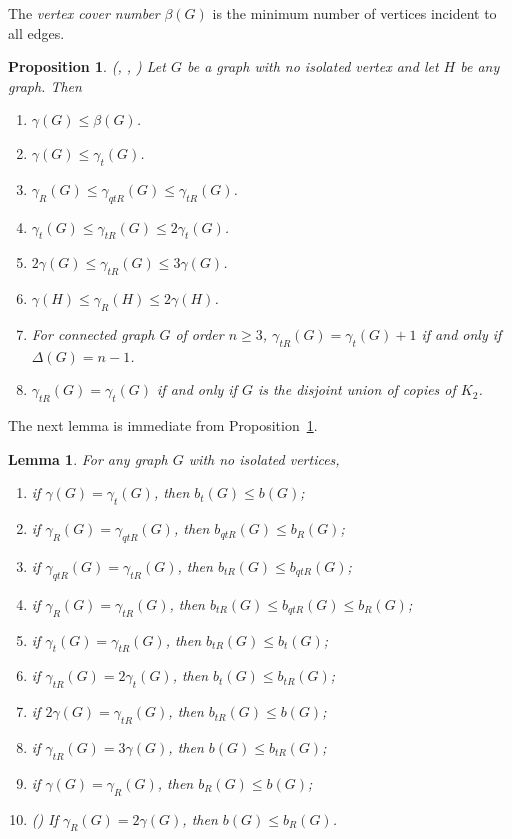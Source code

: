 \documentclass[12pt,reqno]{amsart}
\theoremstyle{plain}
\newtheorem{prelem}{{\bf Proposition}}
\newtheorem{lemma}[theorem]{Lemma}
\numberwithin{equation}{section}
\begin{document}
The \textit{vertex cover number} $\beta(G)$ is the minimum number of vertices incident to all edges.

\begin{prelem}\label{AA}
(\cite[Theorems~4, 5, 6 and Proposition~7]{ah1}, \cite[Relation~(1)]{GG}, \cite[Proposition~1]{Co}) Let $G$ be a graph with no isolated vertex and let $H$ be any graph. Then
\begin{enumerate}
\item $\gamma(G)\leq  \beta (G)$.
\item $\gamma (G)\leq \gamma _t(G)$.
\item $\gamma _R(G)\leq \gamma_{qtR}(G) \leq \gamma_{tR}(G)$.
\item $\gamma _t (G)\leq \gamma _{tR}(G)\leq 2\gamma _t (G)$.
\item $2\gamma (G)\leq \gamma _{tR}(G)\leq 3\gamma (G)$.
\item $\gamma (H)\leq \gamma _{R}(H)\leq 2\gamma  (H)$.
\item For connected graph $G$ of order $n\geq 3$, $\gamma _{tR}(G)=\gamma _t(G)+1$ if and only if $\Delta (G)=n-1$.
\item $\gamma_{tR}(G)=\gamma_t(G)$ if and only if $G$ is the disjoint union of copies of $K_2$.
\end{enumerate}
\end{prelem}

The next lemma is immediate from Proposition~\ref{AA}.
\begin{lemma}\label{m2}
For any graph $G$ with no isolated vertices,
\begin{enumerate}
\item if $\gamma (G)=\gamma_t(G)$, then $b_t(G)\leq b(G)$;
\item if $\gamma _R (G)=\gamma_{qtR}(G)$, then $b_{qtR}(G)\leq b_R(G)$;
\item if $\gamma _{qtR}(G)=\gamma_{tR}(G)$, then $b_{tR}(G)\leq b_{qtR}(G)$;
\item if $\gamma _R(G)=\gamma_{tR}(G)$, then $b_{tR}(G)\leq b_{qtR}(G)\leq b_R(G)$;
\item if $\gamma _t(G)=\gamma_{tR}(G)$, then $b_{tR}(G)\leq b_t(G)$;
\item if $\gamma_{tR}(G)=2\gamma _t(G)$, then $b_t(G)\leq b_{tR}(G)$;
\item if $2\gamma (G)=\gamma_{tR}(G)$, then $b_{tR}(G)\leq b(G)$;
\item if $\gamma _{tR}(G)=3\gamma (G)$, then $b(G)\leq b_{tR}(G)$;
\item if $\gamma (G)=\gamma _R(G)$, then $b_R(G)\leq b(G)$;
\item (\cite[Theorem~5.4]{HuXu}) If $\gamma _R(G)=2\gamma (G)$, then $b(G)\leq b_R(G)$.
\end{enumerate}
\end{lemma}
\end{document}
